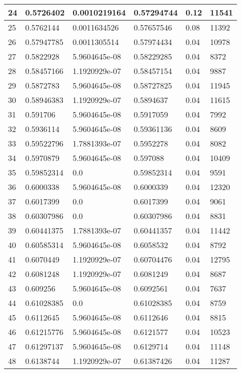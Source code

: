 \begin{longtable}{|l|l|l|l|l|l|}
24 & 0.5726402 & 0.0010219164 & 0.57294744 & 0.12 & 11541 \\ \hline 
25 & 0.5762144 & 0.0011634526 & 0.57657546 & 0.08 & 11392 \\ \hline 
26 & 0.57947785 & 0.0011305514 & 0.57974434 & 0.04 & 10978 \\ \hline 
27 & 0.5822928 & 5.9604645e-08 & 0.58229285 & 0.04 & 8372 \\ \hline 
28 & 0.58457166 & 1.1920929e-07 & 0.58457154 & 0.04 & 9887 \\ \hline 
29 & 0.5872783 & 5.9604645e-08 & 0.58727825 & 0.04 & 11945 \\ \hline 
30 & 0.58946383 & 1.1920929e-07 & 0.5894637 & 0.04 & 11615 \\ \hline 
31 & 0.591706 & 5.9604645e-08 & 0.5917059 & 0.04 & 7992 \\ \hline 
32 & 0.5936114 & 5.9604645e-08 & 0.59361136 & 0.04 & 8609 \\ \hline 
33 & 0.59522796 & 1.7881393e-07 & 0.5952278 & 0.04 & 8082 \\ \hline 
34 & 0.5970879 & 5.9604645e-08 & 0.597088 & 0.04 & 10409 \\ \hline 
35 & 0.59852314 & 0.0 & 0.59852314 & 0.04 & 9591 \\ \hline 
36 & 0.6000338 & 5.9604645e-08 & 0.6000339 & 0.04 & 12320 \\ \hline 
37 & 0.6017399 & 0.0 & 0.6017399 & 0.04 & 9061 \\ \hline 
38 & 0.60307986 & 0.0 & 0.60307986 & 0.04 & 8831 \\ \hline 
39 & 0.60441375 & 1.7881393e-07 & 0.60441357 & 0.04 & 11442 \\ \hline 
40 & 0.60585314 & 5.9604645e-08 & 0.6058532 & 0.04 & 8792 \\ \hline 
41 & 0.6070449 & 1.1920929e-07 & 0.60704476 & 0.04 & 12795 \\ \hline 
42 & 0.6081248 & 1.1920929e-07 & 0.6081249 & 0.04 & 8687 \\ \hline 
43 & 0.609256 & 5.9604645e-08 & 0.6092561 & 0.04 & 7637 \\ \hline 
44 & 0.61028385 & 0.0 & 0.61028385 & 0.04 & 8759 \\ \hline 
45 & 0.6112645 & 5.9604645e-08 & 0.6112646 & 0.04 & 8815 \\ \hline 
46 & 0.61215776 & 5.9604645e-08 & 0.6121577 & 0.04 & 10523 \\ \hline 
47 & 0.61297137 & 5.9604645e-08 & 0.6129714 & 0.04 & 11148 \\ \hline 
48 & 0.6138744 & 1.1920929e-07 & 0.61387426 & 0.04 & 11287 \\ \hline 

\end{longtable}
